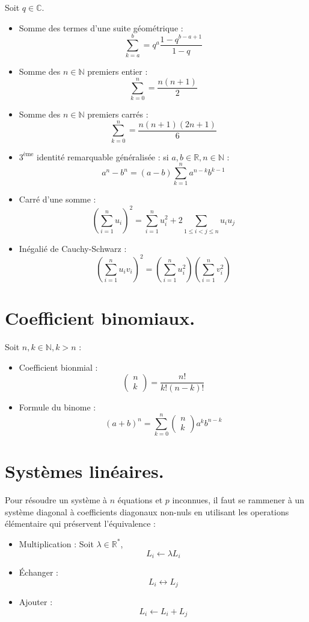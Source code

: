 \documentclass[12pt]{article}
\begin{document}
Soit $q \in \mathbb{C}$.

\begin{itemize}
    \item Somme des termes d'une suite géométrique : $$
\sum_{k = a}^{b} = q^a \frac{1 - q^{b - a + 1}}{1 - q}  
$$
    \item Somme des $n \in \mathbb{N}$ premiers entier : $$
\sum_{k = 0}^{n} = \frac{n(n + 1)}{2}  
$$ 
    \item Somme des $n \in \mathbb{N}$ premiers carrés : $$
\sum_{k = 0}^{n} = \frac{n(n + 1)(2n + 1)}{6}  
$$
    \item $3^{\text{ème}}$ identité remarquable généralisée :
si $a, b \in \mathbb{R}, n \in \mathbb{N}$ : $$
a^n - b^n = (a - b)\sum_{k = 1}^{n} a^{n - k}b^{k - 1}
$$
    \item Carré d'une somme : $$
\left(\sum_{i=1}^{n} u_i \right)^2 =
\sum_{i=1}^{n} u_i^2 + 2\sum_{1 \le i < j \le n} u_i u_j  
$$
    \item Inégalié de Cauchy-Schwarz : $$
\left(\sum_{i=1}^{n} u_i v_i \right)^2 =
\left(\sum_{i=1}^{n} u_i^2 \right) 
\left(\sum_{i=1}^{n} v_i^2 \right)  
$$
\end{itemize}

\section{Coefficient binomiaux.}

Soit $n, k \in \mathbb{N}, k > n$ :
\begin{itemize}
    \item Coefficient bionmial : $$
\begin{pmatrix} n \\ k \end{pmatrix} = 
\frac{n!}{k!(n - k)!} 
$$
    \item Formule du binome : $$
(a + b)^n 
= \sum_{k=0}^{n} \begin{pmatrix} n \\ k \end{pmatrix} a^k b^{n-k}
$$
\end{itemize}

\section{Systèmes linéaires.} 

Pour résoudre un système à $n$ équations et $p$ inconnues,
il faut se rammener à un système diagonal à 
coefficients  diagonaux non-nuls en utilisant
les operations élémentaire qui préservent l'équivalence :
\begin{itemize}
    \item Multiplication : Soit $\lambda \in \mathbb{R}^{*}$, $$
    L_i \leftarrow \lambda L_i
$$
    \item Échanger : $$ L_i \leftrightarrow L_j$$
    \item Ajouter : $$ L_i \leftarrow L_i + L_j$$
\end{itemize}
\end{document}
